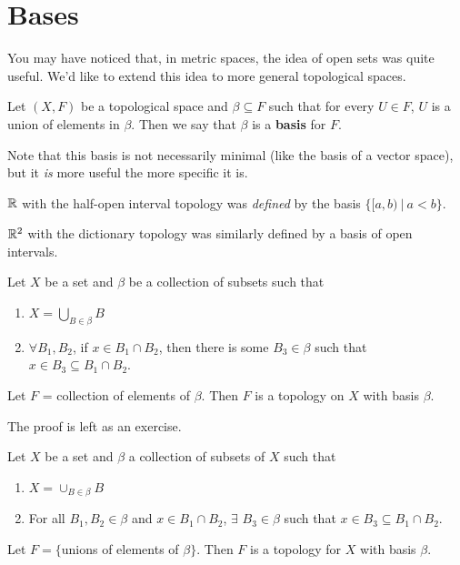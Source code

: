 \section{Bases} You may have noticed that, in metric spaces, the idea of open sets was quite useful. We'd like to extend this idea to more general topological spaces. 
\begin{definition}
	Let $(X,F)$ be a topological space and $\beta\subseteq F$ such that for every $U\in F$, $U$ is a union of elements in $\beta$. Then we say that $\beta$ is a {\bf basis} for $F$. 
\end{definition}

Note that this basis is not necessarily minimal (like the basis of a vector space), but it {\it is} more useful the more specific it is. 
\begin{example}
	$\mathbb R$ with the half-open interval topology was {\it defined} by the basis $\big\{ [a, b)\ |\ a < b\big\}$. 
\end{example}
\begin{example}
	$\mathbb R^2$ with the dictionary topology was similarly defined by a basis of open intervals. 
\end{example}
\begin{theorem}
	Let $X$ be a set and $\beta$ be a collection of subsets such that 
	\begin{enumerate}
		\item $X = \bigcup_{B\in \beta} B$ 
		\item $\forall B_1, B_2$, if $x\in B_1\cap B_2$, then there is some $B_3\in\beta$ such that $x\in B_3\subseteq B_1\cap B_2$. 
	\end{enumerate}
	Let $F$ = collection of elements of $\beta$. Then $F$ is a topology on $X$ with basis $\beta$. 
\end{theorem}
The proof is left as an exercise.
\begin{theorem}
	Let $X$ be a set and $\beta$ a collection of subsets of $X$ such that 
	\begin{enumerate}
		\item $X = \cup_{B \in \beta} B$ 
		\item For all $B_1, B_2 \in \beta$ and $x \in B_1 \cap B_2$, $\exists$ $B_3 \in \beta$ such that $x \in B_3 \subseteq B_1 \cap B_2$. 
	\end{enumerate}
	Let $F = \{$unions of elements of $\beta \}$. Then $F$ is a topology for $X$ with basis $\beta$. 
\end{theorem}
